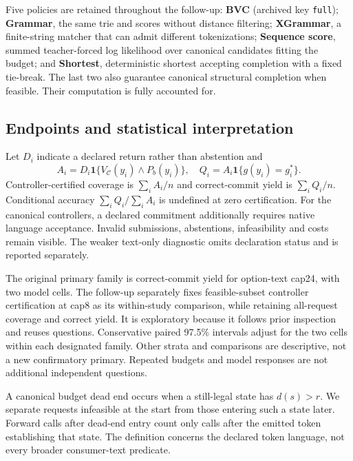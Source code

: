 \documentclass[12pt,a4paper]{article}
\newcommand{\code}[1]{\texttt{#1}}
\begin{document}
Five policies are retained throughout the follow-up: \textbf{BVC} (archived key \code{full}); \textbf{Grammar}, the same trie and scores without distance filtering; \textbf{XGrammar}, a finite-string matcher that can admit different tokenizations; \textbf{Sequence score}, summed teacher-forced log likelihood over canonical candidates fitting the budget; and \textbf{Shortest}, deterministic shortest accepting completion with a fixed tie-break. The last two also guarantee canonical structural completion when feasible. Their computation is fully accounted for.

\subsection{Endpoints and statistical interpretation}\label{sec:endpoints}
Let $D_i$ indicate a declared return rather than abstention and
\begin{equation}
A_i=D_i\mathbf1\{V_{\mathcal C}(y_i)\land P_b(y_i)\},\quad Q_i=A_i\mathbf1\{g(y_i)=g_i^*\}.
\end{equation}
Controller-certified coverage is $\sum_iA_i/n$ and correct-commit yield is $\sum_iQ_i/n$. Conditional accuracy $\sum_iQ_i/\sum_iA_i$ is undefined at zero certification. For the canonical controllers, a declared commitment additionally requires native language acceptance. Invalid submissions, abstentions, infeasibility and costs remain visible. The weaker text-only diagnostic omits declaration status and is reported separately.

The original primary family is correct-commit yield for option-text cap24, with two model cells. The follow-up separately fixes feasible-subset controller certification at cap8 as its within-study comparison, while retaining all-request coverage and correct yield. It is exploratory because it follows prior inspection and reuses questions. Conservative paired 97.5\% intervals adjust for the two cells within each designated family. Other strata and comparisons are descriptive, not a new confirmatory primary. Repeated budgets and model responses are not additional independent questions.

A canonical budget dead end occurs when a still-legal state has $d(s)>r$. We separate requests infeasible at the start from those entering such a state later. Forward calls after dead-end entry count only calls after the emitted token establishing that state. The definition concerns the declared token language, not every broader consumer-text predicate.
\end{document}
